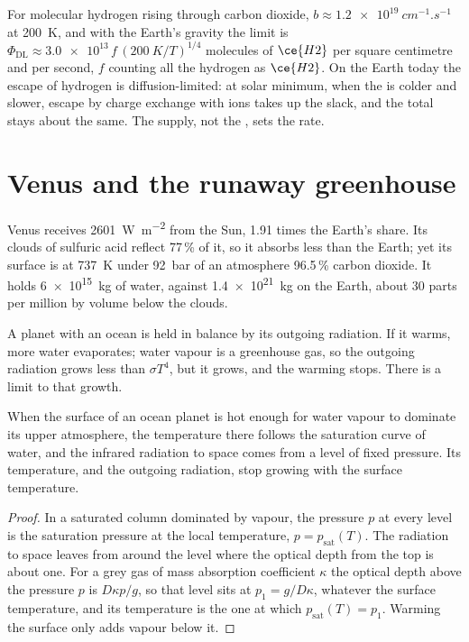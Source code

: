 For molecular hydrogen rising through carbon dioxide, $b \approx
\qty{1.2e19}{cm^{-1}.s^{-1}}$ at \qty{200}{K}, and with the Earth's
gravity the limit is $\Phi_\mathrm{DL} \approx
\num{3.0e13}\,f\,(\qty{200}{K}/T)^{1/4}$ molecules of $\ce{H2}$ per square
centimetre and per second, $f$ counting all the hydrogen as $\ce{H2}$. On
the Earth today the escape of hydrogen is diffusion-limited: at solar
minimum, when the  is colder and  slower, escape by
charge exchange with ions takes up the slack, and the total stays about
the same. The supply, not the
, sets the rate.

\section{Venus and the runaway greenhouse}\label{sec:b3:planetary-atmospheres:venus}

Venus receives \qty{2601}{W.m^{-2}} from the Sun, 1.91 times the Earth's
share. Its clouds of sulfuric acid reflect 77\,\% of it, so it absorbs
less than the Earth; yet its surface is at \qty{737}{K} under \qty{92}{bar}
of an atmosphere 96.5\,\% carbon dioxide. It holds \qty{6e15}{kg} of water,
against \qty{1.4e21}{kg} on the Earth, about 30 parts per million by
volume below the clouds.

A planet with an ocean is held in balance by its outgoing radiation. If
it warms, more water evaporates; water vapour is a greenhouse gas, so the
outgoing radiation grows less than $\sigma T^4$, but it grows, and the
warming stops. There is a limit to that growth.

\begin{proposition}\label{prop:b3:planetary-atmospheres:limit}
When the surface of an ocean planet is hot enough for water vapour to
dominate its upper atmosphere, the temperature there follows the
saturation curve of water, and the infrared radiation to space comes from
a level of fixed pressure. Its temperature, and the outgoing radiation,
stop growing with the surface temperature.
\end{proposition}

\begin{proof}
In a saturated column dominated by vapour, the pressure $p$ at every
level is the saturation pressure at the local temperature, $p =
p_\mathrm{sat}(T)$. The radiation to space leaves from around the level
where the optical depth from the top is about one. For a grey gas of mass
absorption coefficient $\kappa$ the optical depth above the pressure $p$
is $D\kappa p/g$, so that level sits at $p_1 = g/D\kappa$, whatever the
surface temperature, and its temperature is the one at which
$p_\mathrm{sat}(T) = p_1$. Warming the surface only adds vapour below it.
\end{proof}

